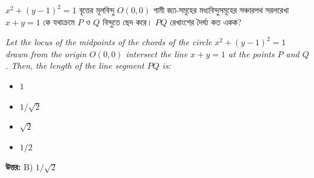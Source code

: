\documentclass[12pt, a4paper]{article}
\begin{document}
\begin{tcolorbox}[questionbox={প্রশ্ন (Question) 48}]
    \noindent
    $x^2 + (y - 1)^2 = 1$ বৃত্তের মূলবিন্দু $O(0,0)$ গামী জ্যা-সমূহের মধ্যবিন্দুসমূহের সঞ্চারপথ সরলরেখা $x + y = 1$ কে যথাক্রমে $P$ ও $Q$ বিন্দুতে ছেদ করে। $PQ$ রেখাংশের দৈর্ঘ্য কত একক?
    
    \vspace{0.8em}
    \begin{english}
    \noindent\textit{\color{darkgray}
    Let the locus of the midpoints of the chords of the circle $x^2 + (y - 1)^2 = 1$ drawn from the origin $O(0,0)$ intersect the line $x + y = 1$ at the points $P$ and $Q$. Then, the length of the line segment $PQ$ is:
    }
    \end{english}
\end{tcolorbox}

\begin{itemize}[label={}, leftmargin=1cm, itemsep=0.5em]
    \item[\textbf{A)}] $1$
    \item[\textbf{B)}] $1/\sqrt{2}$
    \item[\textbf{C)}] $\sqrt{2}$
    \item[\textbf{D)}] $1/2$
\end{itemize}

\vspace{0.5em}
\begin{tcolorbox}[answerbox]
    \textbf{\color{success} উত্তর:} B) $1/\sqrt{2}$
\end{tcolorbox}
\vspace{1em}
\end{document}

